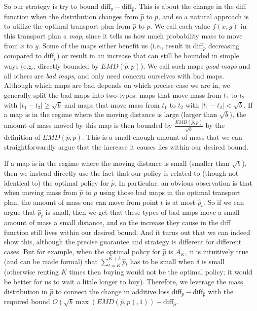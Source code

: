 So our strategy is try to bound $\text{diff}_p - \text{diff}_{\hat{p}}$.  This is about the change in the $\text{diff}$ function when the distribution changes from $\hat p$ to $p$, and so a natural approach is to utilize the optimal transport plan from $\hat p$ to $p$.  We call each value $f(x,y)$ in this transport plan a \emph{map}, since it tells us how much probability mass to move from $x$ to $y$.  Some of the maps either benefit us (i.e., result in $\text{diff}_p$ decreasing compared to $\text{diff}_{\hat p}$) or result in an increase that can still be bounded in simple ways (e.g., directly bounded by $EMD(\hat p, p)$). We call such maps \emph{good maps} and all others are \emph{bad maps}, and only need concern ourselves with bad maps.  Although which maps are bad depends on which precise case we are in, we generally split the bad maps into two types: maps that move mass from $t_1$ to $t_2$ with $|t_1-t_2| \geq \sqrt{b}$ and maps that move mass from $t_1$ to $t_2$ with $|t_1-t_2| < \sqrt{b}$. If a map is in the regime where the moving distance is large (larger than $\sqrt{b}$), the amount of mass moved by this map is then bounded by $\frac{EMD(\hat p, p)}{\sqrt{b}}$ by the definition of $EMD(\hat p, p)$. This is a small enough amount of mass that we can straightforwardly argue that the increase it causes lies within our desired bound.

If a map is in the regime where the moving distance is small (smaller than $\sqrt{b}$), then we instead directly use the fact that our policy is related to (though not identical to) the optimal policy for $\hat p$.  In particular, an obvious observation is that when moving mass from $\hat{p}$ to $p$ using those bad maps in the optimal transport plan, the amount of mass one can move from point $t$ is at most $\hat{p}_t$. So if we can argue that $\hat p_t$ is small, then we get that these types of bad maps move a small amount of mass a small distance, and so the increase they cause in the $\text{diff}$ function still lives within our desired bound.  And it turns out that we can indeed show this, although the precise guarantee and strategy is different for different cases. 
 But for example, when the optimal policy for $\hat{p}$ is $A_K$, it is intuitively true (and can be made formal) that $\sum_{t=K}^{K+\delta} \hat p_t$ has to be small when $\delta$ is small (otherwise renting $K$ times then buying would not be the optimal policy; it would be better for us to wait a little longer to buy). Therefore, we leverage the mass distribution in 
$\hat{p}$ to connect the change in additive loss $\text{diff}_p - \text{diff}_{\hat{p}}$ with the required bound $O(\sqrt{b}\max(EMD(\hat{p},p),1)) - \text{diff}_{\hat{p}}$. 


